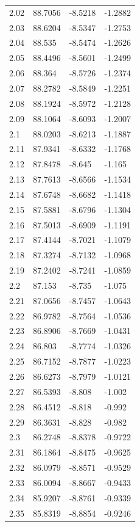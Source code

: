 \begin{tabular}{llll}
2.02 & 88.7056 & -8.5218 & -1.2882 \\
2.03 & 88.6204 & -8.5347 & -1.2753 \\
2.04 & 88.535 & -8.5474 & -1.2626 \\
2.05 & 88.4496 & -8.5601 & -1.2499 \\
2.06 & 88.364 & -8.5726 & -1.2374 \\
2.07 & 88.2782 & -8.5849 & -1.2251 \\
2.08 & 88.1924 & -8.5972 & -1.2128 \\
2.09 & 88.1064 & -8.6093 & -1.2007 \\
2.1 & 88.0203 & -8.6213 & -1.1887 \\
2.11 & 87.9341 & -8.6332 & -1.1768 \\
2.12 & 87.8478 & -8.645 & -1.165 \\
2.13 & 87.7613 & -8.6566 & -1.1534 \\
2.14 & 87.6748 & -8.6682 & -1.1418 \\
2.15 & 87.5881 & -8.6796 & -1.1304 \\
2.16 & 87.5013 & -8.6909 & -1.1191 \\
2.17 & 87.4144 & -8.7021 & -1.1079 \\
2.18 & 87.3274 & -8.7132 & -1.0968 \\
2.19 & 87.2402 & -8.7241 & -1.0859 \\
2.2 & 87.153 & -8.735 & -1.075 \\
2.21 & 87.0656 & -8.7457 & -1.0643 \\
2.22 & 86.9782 & -8.7564 & -1.0536 \\
2.23 & 86.8906 & -8.7669 & -1.0431 \\
2.24 & 86.803 & -8.7774 & -1.0326 \\
2.25 & 86.7152 & -8.7877 & -1.0223 \\
2.26 & 86.6273 & -8.7979 & -1.0121 \\
2.27 & 86.5393 & -8.808 & -1.002 \\
2.28 & 86.4512 & -8.818 & -0.992 \\
2.29 & 86.3631 & -8.828 & -0.982 \\
2.3 & 86.2748 & -8.8378 & -0.9722 \\
2.31 & 86.1864 & -8.8475 & -0.9625 \\
2.32 & 86.0979 & -8.8571 & -0.9529 \\
2.33 & 86.0094 & -8.8667 & -0.9433 \\
2.34 & 85.9207 & -8.8761 & -0.9339 \\
2.35 & 85.8319 & -8.8854 & -0.9246 \\

\end{tabular}
